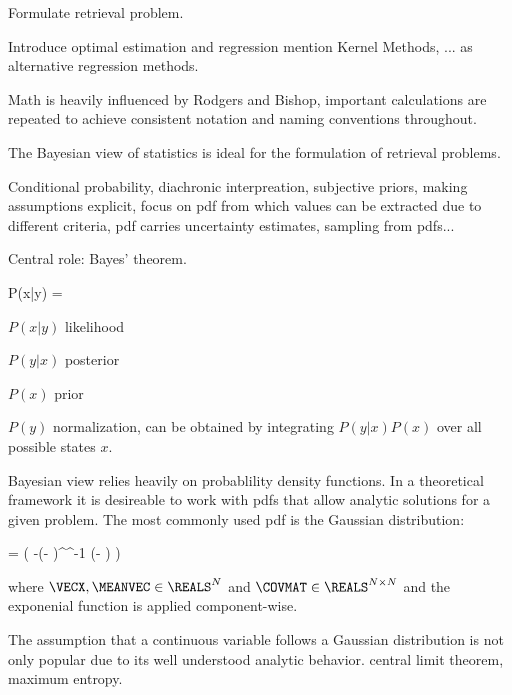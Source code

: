 Formulate retrieval problem.

Introduce optimal estimation and regression mention Kernel Methods, ... as
alternative regression methods.

Math is heavily influenced by Rodgers and Bishop, important calculations are
repeated to achieve consistent notation and naming conventions throughout.

\startsection[title={Bayesian Statistics}]

    The Bayesian view of statistics is ideal for the formulation of retrieval
    problems. 

    Conditional probability, diachronic interpreation, subjective priors,
    making assumptions explicit, focus on pdf from which values can be
    extracted due to different criteria, pdf carries uncertainty estimates,
    sampling from pdfs...

    Central role: Bayes' theorem.
    
    \startformula
        P(x|y) = 
    \stopformula

    $P(x|y)$ likelihood

    $P(y|x)$ posterior

    $P(x)$ prior

    $P(y)$ normalization, can be obtained by integrating $P(y|x)P(x)$
    over all possible states $x$.

     {}

\stopsection

\startsection[title=The Multivariate Gaussian Distribution]

    Bayesian view relies heavily on probablility density functions. In a
    theoretical framework it is desireable to work with pdfs that allow
    analytic solutions for a given problem. The most commonly used pdf is the
    Gaussian distribution:

    \placeformula[eq:gaussian]
    \startformula
        \GAUSS{\VECX}{\MEANVEC}{\COVMAT}
        = 
          \exp \left( -(\VECX - \MEANVEC)^\top \COVMAT^{-1} (\VECX - \MEANVEC) \right)
    \stopformula

    where $\VECX, \MEANVEC \in \REALS^N$ and $\COVMAT \in \REALS^{N
    \times N}$ and the exponenial function is applied component-wise.

    The assumption that a continuous variable follows a Gaussian distribution
    is not only popular due to its well understood analytic behavior. central
    limit theorem, maximum entropy.

